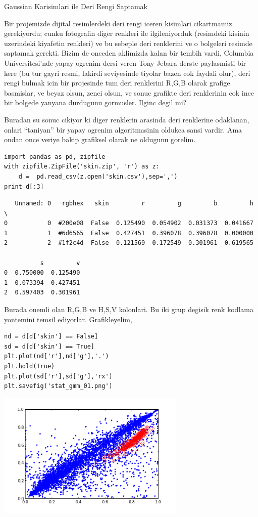 \documentclass[12pt,fleqn]{article}\usepackage{../common}
\begin{document}
Gaussian Karisimlari ile Deri Rengi Saptamak

Bir projemizde dijital resimlerdeki deri rengi iceren kisimlari cikartmamiz
gerekiyordu; cunku fotografin diger renkleri ile ilgileniyorduk (resimdeki
kisinin uzerindeki kiyafetin renkleri) ve bu sebeple deri renklerini ve o
bolgeleri resimde saptamak gerekti. Bizim de onceden aklimizda kalan bir
tembih vardi, Columbia Universitesi'nde yapay ogrenim dersi veren Tony
Jebara derste paylasmisti bir kere (bu tur gayri resmi, lakirdi seviyesinde
tiyolar bazen cok faydali olur), deri rengi bulmak icin bir projesinde tum
deri renklerini R,G,B olarak grafige basmislar, ve beyaz olsun, zenci
olsun, ve sonuc grafikte deri renklerinin cok ince bir bolgede yanyana
durdugunu gormusler. Ilginc degil mi?

Buradan su sonuc cikiyor ki diger renklerin arasinda deri renklerine
odaklanan, onlari ``taniyan'' bir yapay ogrenim algoritmasinin oldukca
sansi vardir. Ama ondan once veriye bakip grafiksel olarak ne oldugunu
gorelim. 

\begin{verbatim}
import pandas as pd, zipfile
with zipfile.ZipFile('skin.zip', 'r') as z:
    d =  pd.read_csv(z.open('skin.csv'),sep=',')
print d[:3]
\end{verbatim}

\begin{verbatim}
   Unnamed: 0   rgbhex   skin         r         g         b         h  \
0           0  #200e08  False  0.125490  0.054902  0.031373  0.041667   
1           1  #6d6565  False  0.427451  0.396078  0.396078  0.000000   
2           2  #1f2c4d  False  0.121569  0.172549  0.301961  0.619565   

          s         v  
0  0.750000  0.125490  
1  0.073394  0.427451  
2  0.597403  0.301961  
\end{verbatim}

Burada onemli olan R,G,B ve H,S,V kolonlari. Bu iki grup degisik renk
kodlama yontemini temsil ediyorlar. Grafikleyelim,

\begin{verbatim}
nd = d[d['skin'] == False]
sd = d[d['skin'] == True]
plt.plot(nd['r'],nd['g'],'.')
plt.hold(True)
plt.plot(sd['r'],sd['g'],'rx')
plt.savefig('stat_gmm_01.png')
\end{verbatim}


\includegraphics[height=6cm]{stat_gmm_01.png}
\end{document}
